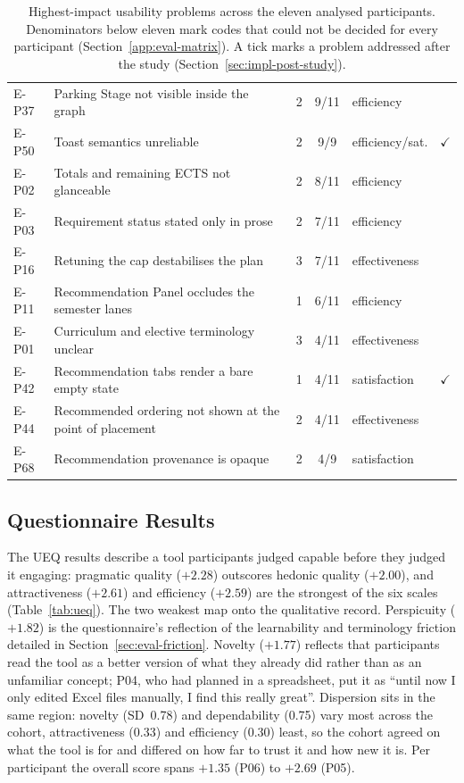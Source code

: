\begin{table}[htpb]
\begin{tabular}{@{}l>{\raggedright\arraybackslash}p{7.0cm}ccl c@{}}
        E-P37 & Parking Stage not visible inside the graph & 2 & 9/11 & efficiency & \\
        E-P50 & Toast semantics unreliable & 2 & 9/9 & efficiency/sat. & $\checkmark$ \\
        E-P02 & Totals and remaining ECTS not glanceable & 2 & 8/11 & efficiency & \\
        E-P03 & Requirement status stated only in prose & 2 & 7/11 & efficiency & \\
        E-P16 & Retuning the cap destabilises the plan & 3 & 7/11 & effectiveness & \\
        E-P11 & Recommendation Panel occludes the semester lanes & 1 & 6/11 & efficiency & \\
        E-P01 & Curriculum and elective terminology unclear & 3 & 4/11 & effectiveness & \\
        E-P42 & Recommendation tabs render a bare empty state & 1 & 4/11 & satisfaction & $\checkmark$ \\
        E-P44 & Recommended ordering not shown at the point of placement & 2 & 4/11 & effectiveness & \\
        E-P68 & Recommendation provenance is opaque & 2 & 4/9 & satisfaction & \\
        \bottomrule
    \end{tabular}
    \caption{Highest-impact usability problems across the eleven analysed participants. Denominators below eleven mark codes that could not be decided for every participant (Section~\ref{app:eval-matrix}). A tick marks a problem addressed after the study (Section~\ref{sec:impl-post-study}).}
    \label{tab:problems}
\end{table}


\subsection{Questionnaire Results}
\label{sec:eval-questionnaire}
The UEQ results describe a tool participants judged capable before they judged it engaging: pragmatic quality ($+2.28$) outscores hedonic quality ($+2.00$), and attractiveness ($+2.61$) and efficiency ($+2.59$) are the strongest of the six scales (Table~\ref{tab:ueq}). The two weakest map onto the qualitative record. Perspicuity ($+1.82$) is the questionnaire's reflection of the learnability and terminology friction detailed in Section~\ref{sec:eval-friction}. Novelty ($+1.77$) reflects that participants read the tool as a better version of what they already did rather than as an unfamiliar concept; P04, who had planned in a spreadsheet, put it as \enquote{until now I only edited Excel files manually, I find this really great}. Dispersion sits in the same region: novelty (SD~0.78) and dependability (0.75) vary most across the cohort, attractiveness (0.33) and efficiency (0.30) least, so the cohort agreed on what the tool is for and differed on how far to trust it and how new it is. Per participant the overall score spans $+1.35$ (P06) to $+2.69$ (P05).

